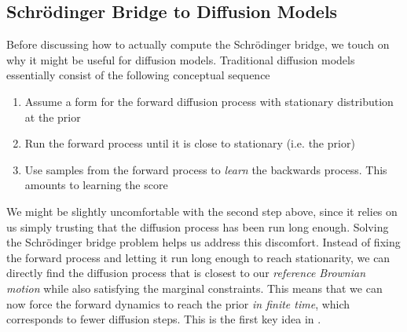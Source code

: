 \documentclass{article}
\begin{document}
\subsection{Schrödinger Bridge to Diffusion Models}
Before discussing how to actually compute the Schrödinger bridge, we touch on
why it might be useful for diffusion models. Traditional diffusion models
essentially consist of the following conceptual sequence
\begin{enumerate}
    \item Assume a form for the forward diffusion process with stationary
    distribution at the prior
    \item Run the forward process until it is close to stationary (i.e. the prior)
    \item Use samples from the forward process to \emph{learn} the backwards process.
    This amounts to learning the score
    \cite{ho2020denoisingdiffusionprobabilisticmodels}
    \cite{song2020generativemodelingestimatinggradients}
\end{enumerate}
We might be slightly uncomfortable with the second step above, since it relies
on us simply trusting that the diffusion process has been run long enough.
Solving the Schrödinger bridge problem helps us address this discomfort.
Instead of fixing the forward process and letting it run long enough to reach
stationarity, we can directly find the diffusion process that is closest to
our \emph{reference Brownian motion} while also satisfying the marginal
constraints. This means that we can now force the forward dynamics
to reach the prior \emph{in finite time}, which corresponds to fewer
diffusion steps. This is the
first key idea in \cite{debortoli2023diffusionschrodingerbridgeapplications}.
\end{document}
